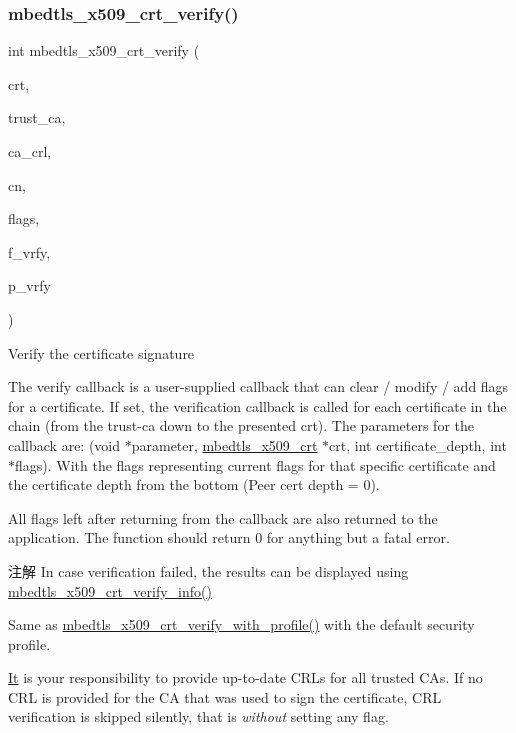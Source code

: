 \subsubsection{\texorpdfstring{mbedtls\+\_\+x509\+\_\+crt\+\_\+verify()}{mbedtls\_x509\_crt\_verify()}}
{\footnotesize\ttfamily int mbedtls\+\_\+x509\+\_\+crt\+\_\+verify (\begin{DoxyParamCaption}\item[{\hyperlink{structmbedtls__x509__crt}{mbedtls\+\_\+x509\+\_\+crt} $\ast$}]{crt,  }\item[{\hyperlink{structmbedtls__x509__crt}{mbedtls\+\_\+x509\+\_\+crt} $\ast$}]{trust\+\_\+ca,  }\item[{\hyperlink{structmbedtls__x509__crl}{mbedtls\+\_\+x509\+\_\+crl} $\ast$}]{ca\+\_\+crl,  }\item[{const char $\ast$}]{cn,  }\item[{uint32\+\_\+t $\ast$}]{flags,  }\item[{int($\ast$)(\hyperlink{interfacevoid}{void} $\ast$, \hyperlink{structmbedtls__x509__crt}{mbedtls\+\_\+x509\+\_\+crt} $\ast$, int, uint32\+\_\+t $\ast$)}]{f\+\_\+vrfy,  }\item[{\hyperlink{interfacevoid}{void} $\ast$}]{p\+\_\+vrfy }\end{DoxyParamCaption})}



Verify the certificate signature 

The verify callback is a user-\/supplied callback that can clear / modify / add flags for a certificate. If set, the verification callback is called for each certificate in the chain (from the trust-\/ca down to the presented crt). The parameters for the callback are\+: (void $\ast$parameter, \hyperlink{structmbedtls__x509__crt}{mbedtls\+\_\+x509\+\_\+crt} $\ast$crt, int certificate\+\_\+depth, int $\ast$flags). With the flags representing current flags for that specific certificate and the certificate depth from the bottom (Peer cert depth = 0).

All flags left after returning from the callback are also returned to the application. The function should return 0 for anything but a fatal error.

\begin{DoxyNote}{注解}
In case verification failed, the results can be displayed using {\ttfamily \hyperlink{group__x509__module_gae88f1d8e6696eb2beeffe0a708219e6b}{mbedtls\+\_\+x509\+\_\+crt\+\_\+verify\+\_\+info()}} 

Same as {\ttfamily \hyperlink{group__x509__module_gaf044a51e5b5bc854bf12aeeccb440e55}{mbedtls\+\_\+x509\+\_\+crt\+\_\+verify\+\_\+with\+\_\+profile()}} with the default security profile.

\hyperlink{class_it}{It} is your responsibility to provide up-\/to-\/date C\+R\+Ls for all trusted C\+As. If no C\+RL is provided for the CA that was used to sign the certificate, C\+RL verification is skipped silently, that is {\itshape without} setting any flag.
\end{DoxyNote}

